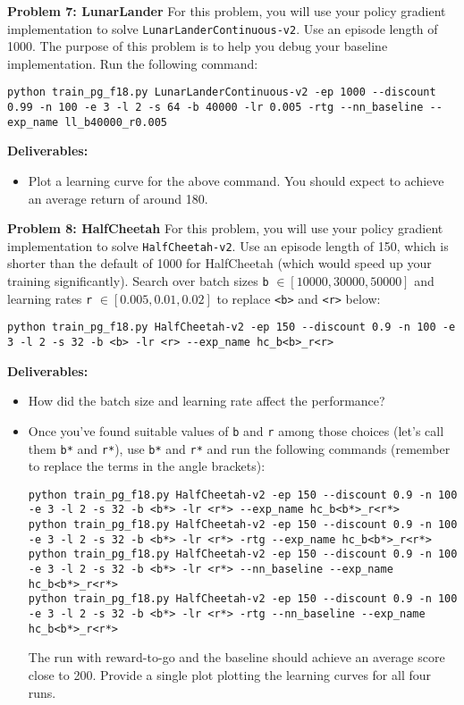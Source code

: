 \documentclass[12pt]{article}
\begin{document}
\textbf{Problem 7: LunarLander} For this problem, you will use your policy gradient implementation to solve \verb|LunarLanderContinuous-v2|.
Use an episode length of 1000. The purpose of this problem is to help you debug your baseline implementation.
Run the following command:
\begin{lstlisting}
python train_pg_f18.py LunarLanderContinuous-v2 -ep 1000 --discount 0.99 -n 100 -e 3 -l 2 -s 64 -b 40000 -lr 0.005 -rtg --nn_baseline --exp_name ll_b40000_r0.005
\end{lstlisting}
\textbf{Deliverables:}
\begin{itemize}
    \item Plot a learning curve for the above command. You should expect to achieve an average return of around 180.
\end{itemize}

\textbf{Problem 8: HalfCheetah} For this problem, you will use your policy gradient implementation to solve \verb|HalfCheetah-v2|. 
Use an episode length of 150, which is shorter than the default of 1000 for HalfCheetah (which would speed up your training significantly).
Search over batch sizes \texttt{b} $\in [10000,30000,50000]$ and learning rates \texttt{r} $\in [0.005, 0.01, 0.02]$ to replace \texttt{<b>} and \texttt{<r>} below:
\begin{lstlisting}
python train_pg_f18.py HalfCheetah-v2 -ep 150 --discount 0.9 -n 100 -e 3 -l 2 -s 32 -b <b> -lr <r> --exp_name hc_b<b>_r<r>
\end{lstlisting}
\textbf{Deliverables:}
\begin{itemize}
    \item How did the batch size and learning rate affect the performance?
    \item Once you've found suitable values of \texttt{b} and \texttt{r} among those choices (let's call them \texttt{b*} and \texttt{r*}), use \texttt{b*} and \texttt{r*}
and run the following commands (remember to replace the terms in the angle brackets):
\begin{lstlisting}
python train_pg_f18.py HalfCheetah-v2 -ep 150 --discount 0.9 -n 100 -e 3 -l 2 -s 32 -b <b*> -lr <r*> --exp_name hc_b<b*>_r<r*>
python train_pg_f18.py HalfCheetah-v2 -ep 150 --discount 0.9 -n 100 -e 3 -l 2 -s 32 -b <b*> -lr <r*> -rtg --exp_name hc_b<b*>_r<r*>
python train_pg_f18.py HalfCheetah-v2 -ep 150 --discount 0.9 -n 100 -e 3 -l 2 -s 32 -b <b*> -lr <r*> --nn_baseline --exp_name hc_b<b*>_r<r*>
python train_pg_f18.py HalfCheetah-v2 -ep 150 --discount 0.9 -n 100 -e 3 -l 2 -s 32 -b <b*> -lr <r*> -rtg --nn_baseline --exp_name hc_b<b*>_r<r*>
\end{lstlisting}
The run with reward-to-go and the baseline should achieve an average score close to 200. Provide a single plot plotting the learning curves for all four runs.
\end{itemize}
\end{document}

